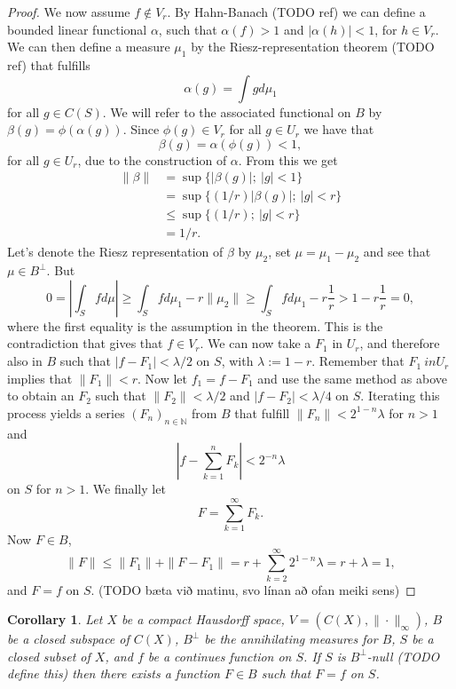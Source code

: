 \documentclass[a4paper,12pt,twoside,BCOR=10mm]{scrbook}
\newtheorem{corollary}{Corollary}
\begin{document}
\begin{proof}
We now assume $f \not \in V_r$.
By Hahn-Banach (TODO ref) we can define a bounded linear functional $\alpha$, such that $\alpha(f) > 1$ and $|\alpha(h)| < 1$, for $h \in V_r$.
We can then define a measure $\mu_1$ by the Riesz-representation theorem (TODO ref) that fulfills
\[
	\alpha(g) = \int g d\mu_1
\]
for all $g \in C(S)$.
We will refer to the associated functional on $B$ by $\beta(g) = \phi(\alpha(g))$.
Since $\phi(g) \in V_r$ for all $g \in U_r$ we have that
\[
	\beta(g) = \alpha(\phi(g)) < 1,
\]
for all $g \in U_r$,
	due to the construction of $\alpha$.
From this we get
\begin{align*}
	\| \beta \|
	&= \sup \{ |\beta(g)|;\ |g| < 1 \}\\
	&= \sup \{ (1/r)|\beta(g)|;\ |g| < r \}\\
	&\leq \sup \{ (1/r);\ |g| < r \}\\
	&= 1/r.
\end{align*}
Let's denote the Riesz representation of $\beta$ by $\mu_2$, set $\mu = \mu_1 - \mu_2$ and see that $\mu \in B^{\bot}$.
But
\[
	0 = \left | \int_S f d\mu \right | 
		\geq \int_S f d\mu_1 - r\|\mu_2\| 
		\geq \int_S f d\mu_1 - r\frac{1}{r}
		> 1 - r \frac{1}{r} = 0,
\]
where the first equality is the assumption in the theorem.
This is the contradiction that gives that $f \in V_r$.
We can now take a $F_1$ in $U_r$, and therefore also in $B$ such that $|f - F_1| < \lambda/2$ on $S$, with $\lambda := 1 - r$.
Remember that $F_1 \ in U_r$ implies that $\|F_1\| < r$.
Now let $f_1 = f - F_1$ and use the same method as above to obtain an $F_2$ such that $\|F_2\| < \lambda/2$ and $|f - F_2| < \lambda/4$ on $S$.
Iterating this process yields a series $(F_n)_{n \in \mathbb{N}}$ from $B$ that fulfill $\|F_n\| < 2^{1 - n}\lambda$ for $n > 1$ and
\[
	\left | f - \sum_{k = 1}^n F_k \right | < 2^{-n}\lambda
\]
on $S$ for $n > 1$.
We finally let 
\[
F = \sum_{k = 1}^{\infty} F_k.
\]
Now $F \in B$,
\[
	\|F\| \leq \|F_1\| + \|F - F_1\| = r + \sum_{k = 2}^{\infty}2^{1 - n}\lambda = r + \lambda = 1,
\]
and $F = f$ on $S$. (TODO bæta við matinu, svo línan að ofan meiki sens)
\end{proof}
\begin{corollary}
Let $X$ be a compact Hausdorff space,
	$V = (C(X), \| \cdot \|_{\infty})$,
	$B$ be a closed subspace of $C(X)$,
	$B^{\bot}$ be the annihilating measures for $B$,
	$S$ be a closed subset of $X$,
	and $f$ be a continues function on $S$.
If $S$ is $B^{\bot}$-null (TODO define this) then there exists a function $F \in B$ such that $F = f$ on $S$.
\end{corollary}
\end{document}
